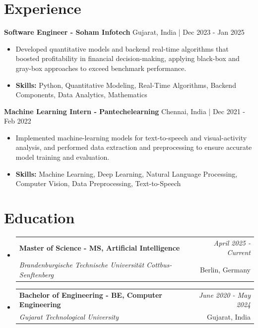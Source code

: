 \documentclass[a4paper,11pt]{article}
\makeatletter
\newcommand{\resumeSubheading}[4]{
\vspace{0.5mm}\item
    \begin{tabular*}{\linewidth}[t]{l@{\extracolsep{\fill}}r}
        \textbf{#1} & \textit{\footnotesize{#4}} \\
        \textit{\footnotesize{#3}} &  \footnotesize{#2}\\
    \end{tabular*}
    \vspace{-2.4mm}
}
\makeatother
\begin{document}
\section{\textbf{Experience}}


\vspace{1mm}
  \textbf{Software Engineer - Soham Infotech} \hfill Gujarat, India | Dec 2023 - Jan 2025
\vspace{-1.5mm} %
\begin{itemize}
  \item Developed quantitative models and backend real-time algorithms that boosted profitability in financial decision-making, applying black-box and gray-box approaches to exceed benchmark performance.

\vspace{-2mm}
  \item \textbf{Skills:} Python, Quantitative Modeling, Real-Time Algorithms, Backend Components, Data Analytics, Mathematics
\end{itemize}

\vspace{1mm}
  \textbf{Machine Learning Intern - Pantechelearning} \hfill Chennai, India | Dec 2021 - Feb 2022
\vspace{-1.5mm} %
\begin{itemize}
  \item Implemented machine-learning models for text-to-speech and visual-activity analysis, and performed data extraction and preprocessing to ensure accurate model training and evaluation.
\vspace{-2mm}
  \item \textbf{Skills:} Machine Learning, Deep Learning, Natural Language Processing, Computer Vision, Data Preprocessing, Text-to-Speech
\end{itemize}\section{\textbf{Education}}
\vspace{-0.4mm}

\begin{itemize}[leftmargin=0.15in, label={}]
\resumeSubheading
{Master of Science - MS, Artificial Intelligence }{Berlin, Germany}
{Brandenburgische Technische Universität Cottbus-Senftenberg  }{April 2025 - Current}

\vspace{1.0mm} %
\resumeSubheading
{Bachelor of Engineering - BE, Computer Engineering  }{Gujarat, India}
{Gujarat Technological University }{June 2020 - May 2024}

\end{itemize}
\end{document}
